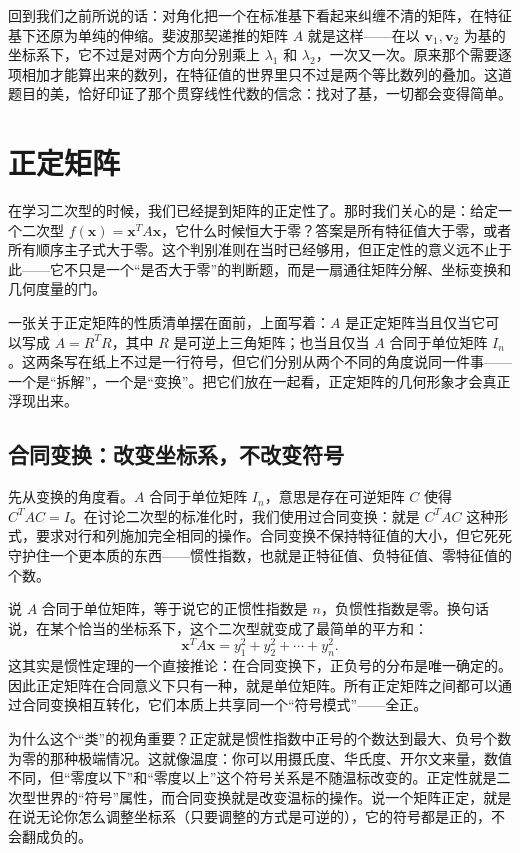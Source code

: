 \documentclass[UTF8]{ctexbook}
\begin{document}
回到我们之前所说的话：对角化把一个在标准基下看起来纠缠不清的矩阵，在特征基下还原为单纯的伸缩。斐波那契递推的矩阵 $A$ 就是这样——在以 $\mathbf{v}_1,\mathbf{v}_2$ 为基的坐标系下，它不过是对两个方向分别乘上 $\lambda_1$ 和 $\lambda_2$，一次又一次。原来那个需要逐项相加才能算出来的数列，在特征值的世界里只不过是两个等比数列的叠加。这道题目的美，恰好印证了那个贯穿线性代数的信念：找对了基，一切都会变得简单。

\newpage

\section{正定矩阵}

在学习二次型的时候，我们已经提到矩阵的正定性了。那时我们关心的是：给定一个二次型 \(f(\mathbf{x}) = \mathbf{x}^T A \mathbf{x}\)，它什么时候恒大于零？答案是所有特征值大于零，或者所有顺序主子式大于零。这个判别准则在当时已经够用，但正定性的意义远不止于此——它不只是一个“是否大于零”的判断题，而是一扇通往矩阵分解、坐标变换和几何度量的门。

一张关于正定矩阵的性质清单摆在面前，上面写着：\(A\) 是正定矩阵当且仅当它可以写成 \(A = R^T R\)，其中 \(R\) 是可逆上三角矩阵；也当且仅当 \(A\) 合同于单位矩阵 \(I_n\)。这两条写在纸上不过是一行符号，但它们分别从两个不同的角度说同一件事——一个是“拆解”，一个是“变换”。把它们放在一起看，正定矩阵的几何形象才会真正浮现出来。

\subsection{合同变换：改变坐标系，不改变符号}

先从变换的角度看。\(A\) 合同于单位矩阵 \(I_n\)，意思是存在可逆矩阵 \(C\) 使得 \(C^T A C = I\)。在讨论二次型的标准化时，我们使用过合同变换：就是 \(C^T A C\) 这种形式，要求对行和列施加完全相同的操作。合同变换不保持特征值的大小，但它死死守护住一个更本质的东西——惯性指数，也就是正特征值、负特征值、零特征值的个数。

说 \(A\) 合同于单位矩阵，等于说它的正惯性指数是 \(n\)，负惯性指数是零。换句话说，在某个恰当的坐标系下，这个二次型就变成了最简单的平方和：
\[
\mathbf{x}^T A\mathbf{x} = y_1^2 + y_2^2 + \cdots + y_n^2.
\]
这其实是惯性定理的一个直接推论：在合同变换下，正负号的分布是唯一确定的。因此正定矩阵在合同意义下只有一种，就是单位矩阵。所有正定矩阵之间都可以通过合同变换相互转化，它们本质上共享同一个“符号模式”——全正。

为什么这个“类”的视角重要？正定就是惯性指数中正号的个数达到最大、负号个数为零的那种极端情况。这就像温度：你可以用摄氏度、华氏度、开尔文来量，数值不同，但“零度以下”和“零度以上”这个符号关系是不随温标改变的。正定性就是二次型世界的“符号”属性，而合同变换就是改变温标的操作。说一个矩阵正定，就是在说无论你怎么调整坐标系（只要调整的方式是可逆的），它的符号都是正的，不会翻成负的。
\end{document}
